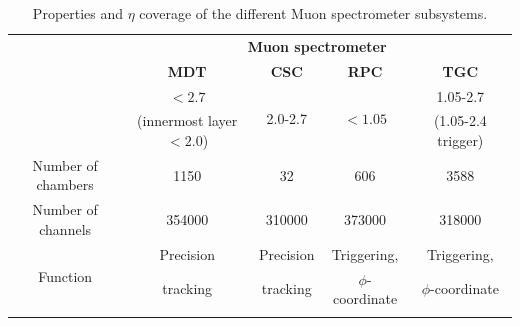 \begin{table}[!ht]
  \begin{center}
    \begin{small}
      \setlength{\tabcolsep}{0.0pc}
      \begin{tabular*}{\textwidth}{@{\extracolsep{\fill}}ccccc}
        \noalign{\smallskip}\hline\hline\noalign{\smallskip}
                                     & \multicolumn{4}{c}{\textbf{Muon spectrometer}} \\
                                     & \textbf{MDT} & \textbf{CSC} & \textbf{RPC} & \textbf{TGC} \\
        \noalign{\smallskip}\hline\noalign{\smallskip}
        \multirow{2}{*}{$|\eta|$ coverage}     & $<2.7$          & \multirow{2}{*}{2.0-2.7} & \multirow{2}{*}{$<1.05$} & 1.05-2.7 \\
                                               & (innermost layer $<2.0$)          &  &  & (1.05-2.4 trigger) \\
         Number of chambers                            & 1150           & 32            & 606            & 3588       \\
         Number of channels                            & 354000         &310000         & 373000         & 318000     \\
         \multirow{2}{*}{Function}                     & Precision      & Precision& Triggering, & Triggering, \\
                                                       & tracking       & tracking & $\phi$-coordinate & $\phi$-coordinate \\
        \noalign{\smallskip}\hline\hline\noalign{\smallskip}
      \end{tabular*}
    \end{small}
  \end{center}
  \caption{Properties and $\eta$ coverage of the different Muon spectrometer subsystems.}
  \label{tab:MuonSpectrometerDetails}
\end{table}

